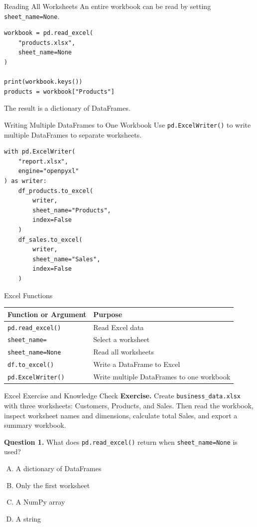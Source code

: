 \documentclass[aspectratio=169,11pt]{beamer}
\newcommand{\code}[1]{\texttt{#1}}
\newcommand{\smallgap}{\vspace{0.4em}}
\begin{document}
\begin{frame}[fragile]{Reading All Worksheets}
An entire workbook can be read by setting \code{sheet\_name=None}.

\begin{lstlisting}[style=pythonstyle]
workbook = pd.read_excel(
    "products.xlsx",
    sheet_name=None
)

print(workbook.keys())
products = workbook["Products"]
\end{lstlisting}

The result is a dictionary of DataFrames.
\end{frame}

\begin{frame}[fragile]{Writing Multiple DataFrames to One Workbook}
Use \code{pd.ExcelWriter()} to write multiple DataFrames to separate worksheets.

\begin{lstlisting}[style=pythonstyle]
with pd.ExcelWriter(
    "report.xlsx",
    engine="openpyxl"
) as writer:
    df_products.to_excel(
        writer,
        sheet_name="Products",
        index=False
    )
    df_sales.to_excel(
        writer,
        sheet_name="Sales",
        index=False
    )
\end{lstlisting}
\end{frame}

\begin{frame}{Excel Functions}
\begin{tabularx}{\textwidth}{lX}
\toprule
\textbf{Function or Argument} & \textbf{Purpose} \\
\midrule
\code{pd.read\_excel()} & Read Excel data \\
\code{sheet\_name=} & Select a worksheet \\
\code{sheet\_name=None} & Read all worksheets \\
\code{df.to\_excel()} & Write a DataFrame to Excel \\
\code{pd.ExcelWriter()} & Write multiple DataFrames to one workbook \\
\bottomrule
\end{tabularx}
\end{frame}

\begin{frame}{Excel Exercise and Knowledge Check}
\textbf{Exercise.} Create \code{business\_data.xlsx} with three worksheets: Customers, Products, and Sales. Then read the workbook, inspect worksheet names and dimensions, calculate total Sales, and export a summary workbook.

\smallgap
\textbf{Question 1.} What does \code{pd.read\_excel()} return when \code{sheet\_name=None} is used?
\begin{enumerate}[A.]
  \item A dictionary of DataFrames
  \item Only the first worksheet
  \item A NumPy array
  \item A string
\end{enumerate}
\end{frame}
\end{document}
